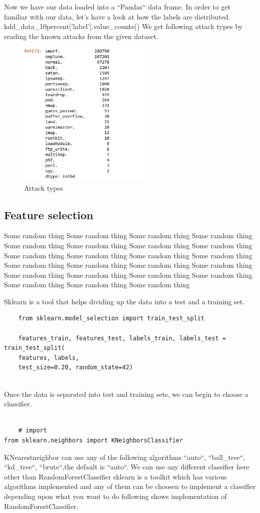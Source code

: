 Now we have our data loaded into a ``Pandas`` data frame. In order to get familiar with our data, let's have a look at how the labels are distributed. 
kdd\_data\_10percent['label'].value\_counts()
We get following attack types by reading the known attacks from the given dataset.
\begin{figure}[h]
    \centering
    \includegraphics[height=7cm]{texfiles/images/code3.jpg}
    \caption{Attack types}
    \label{fig:code3}
\end{figure}
\subsection{Feature selection}

Some random thing Some random thing Some random thing Some random thing Some random thing Some random thing Some random thing Some random thing Some random thing Some random thing Some random thing Some random thing Some random thing Some random thing Some random thing Some random thing Some random thing Some random thing Some random thing Some random thing Some random thing Some random thing Some random thing  

Sklearn is a tool that helps dividing up the data into a test and a training set.
\begin{verbatim}
	from sklearn.model_selection import train_test_split
	
	features_train, features_test, labels_train, labels_test = train_test_split(
	features, labels, 
	test_size=0.20, random_state=42)
	
\end{verbatim}

Once the data is separated into test and training sets, we can begin to choose a classifier. 

\begin{verbatim}

	# import
from sklearn.neighbors import KNeighborsClassifier	

\end{verbatim}
KNearestneighbor can use any of the following 
algorithms ``auto``, ``ball\_tree``, ``kd\_tree``, ``brute``,the  default is ``auto``.
We can use any different classifier here other than RandomForestClassifier
sklearn is a toolkit which has various algorithms implemented and any of them can be choosen to 
implement a classifier depending upon what you want to do following shows implementation of RandomForestClassifier.

